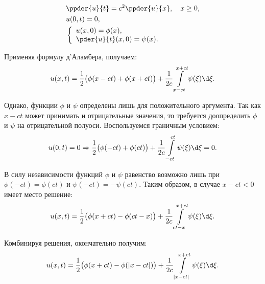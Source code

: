 \begin{align*}
    & \ppder{u}{t} = c^2\ppder{u}{x}, \quad x \ge 0, \\
    & u(0, t) = 0, \\
    & \left\{ \begin{array}{l}
        u(x, 0) = \phi(x), \\
        \ds \pder{u}{t}(x, 0) = \psi(x).
    \end{array} \right.
\end{align*}

Применяя формулу д'Аламбера, получаем:
\[
    u(x, t) = \frac{1}{2}\bigl(\phi(x - ct) + \phi(x + ct)\bigr) +
    \frac{1}{2c}\int\limits_{x - ct}^{x + ct} \psi(\xi)\d\xi.
\]

Однако, функции \( \phi \) и \( \psi \) определены лишь для положительного
аргумента. Так как \( x - ct \) может принимать и отрицательные значения, то
требуется доопределить \( \phi \) и \( \psi \) на отрицательной полуоси.
Воспользуемся граничным условием:
\[
    u(0, t) = 0 \Rightarrow \frac{1}{2}\bigl(\phi(-ct) + \phi(ct)\bigr) +
    \frac{1}{2c}\int\limits_{-ct}^{ct} \psi(\xi)\d\xi = 0.
\]

В силу независимости функций \( \phi \) и \( \psi \) равенство возможно лишь при
\( \phi(-ct) = \phi(ct) \) и \( \psi(-ct) = -\psi(ct) \). Таким образом, в
случае \( x - ct < 0 \) имеет место решение:
\[
    u(x, t) = \frac{1}{2}\bigl(\phi(x + ct) - \phi(ct - x)\bigr) +
    \frac{1}{2c}\int\limits_{ct - x}^{x + ct} \psi(\xi)\d\xi.
\]

Комбинируя решения, окончательно получим:
\[
    u(x, t) = \frac{1}{2}\bigl(\phi(x + ct) - \phi(|x - ct|)\bigr) +
    \frac{1}{2c}\int\limits_{|x - ct|}^{x + ct} \psi(\xi)\d\xi.
\]
\newpage
